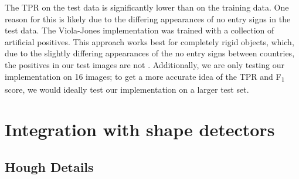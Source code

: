 \documentclass[twocolumn, 10pt, a4paper]{article}
\begin{document}
The TPR on the test data is significantly lower than on the training data.
One reason for this is likely due to the differing appearances of no entry signs in the test data.
The Viola-Jones implementation was trained with a collection of artificial positives.
This approach works best for completely rigid objects, which, due to the slightly differing appearances of the no entry signs between countries, the positives in our test images are not \cite{training}.
Additionally, we are only testing our implementation on 16 images; to get a more accurate idea of the TPR and F\textsubscript{1} score, we would ideally test our implementation on a larger test set.

\clearpage

\section{Integration with shape detectors}

\subsection{Hough Details}
\end{document}

